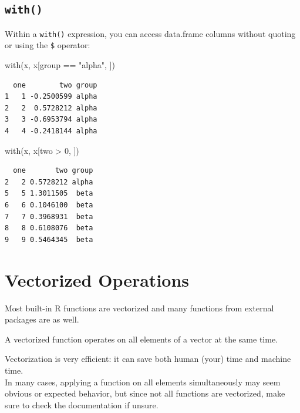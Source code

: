 \documentclass[
]{book}
\newenvironment{Shaded}{\begin{snugshade}}{\end{snugshade}}
\newcommand{\DecValTok}[1]{\textcolor[rgb]{0.00,0.00,0.81}{#1}}
\newcommand{\FunctionTok}[1]{\textcolor[rgb]{0.00,0.00,0.00}{#1}}
\newcommand{\NormalTok}[1]{#1}
\newcommand{\SpecialCharTok}[1]{\textcolor[rgb]{0.00,0.00,0.00}{#1}}
\newcommand{\StringTok}[1]{\textcolor[rgb]{0.31,0.60,0.02}{#1}}
\begin{document}
\hypertarget{with}{%
\section{\texorpdfstring{\texttt{with()}}{with()}}\label{with}}

Within a \texttt{with()} expression, you can access data.frame columns without quoting or using the \texttt{\$} operator:

\begin{Shaded}
\begin{Highlighting}[]
\FunctionTok{with}\NormalTok{(x, x[group }\SpecialCharTok{==} \StringTok{"alpha"}\NormalTok{, ])}
\end{Highlighting}
\end{Shaded}

\begin{verbatim}
  one        two group
1   1 -0.2500599 alpha
2   2  0.5728212 alpha
3   3 -0.6953794 alpha
4   4 -0.2418144 alpha
\end{verbatim}

\begin{Shaded}
\begin{Highlighting}[]
\FunctionTok{with}\NormalTok{(x, x[two }\SpecialCharTok{\textgreater{}} \DecValTok{0}\NormalTok{, ])}
\end{Highlighting}
\end{Shaded}

\begin{verbatim}
  one       two group
2   2 0.5728212 alpha
5   5 1.3011505  beta
6   6 0.1046100  beta
7   7 0.3968931  beta
8   8 0.6108076  beta
9   9 0.5464345  beta
\end{verbatim}

\hypertarget{vectorization}{%
\chapter{Vectorized Operations}\label{vectorization}}

Most built-in R functions are vectorized and many functions from external packages are as well.

\begin{rmdtip}
A vectorized function operates on all elements of a vector at the same
time.
\end{rmdtip}

Vectorization is very efficient: it can save both human (your) time and machine time.\\
In many cases, applying a function on all elements simultaneously may seem obvious or expected behavior, but since not all functions are vectorized, make sure to check the documentation if unsure.
\end{document}
